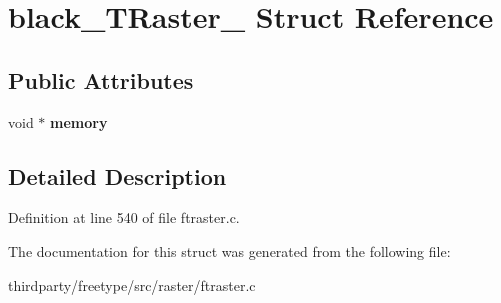 \hypertarget{structblack___t_raster__}{}\section{black\+\_\+\+T\+Raster\+\_\+ Struct Reference}
\label{structblack___t_raster__}
\subsection*{Public Attributes}
\begin{DoxyCompactItemize}
\item 
\mbox{\label{structblack___t_raster___ad6a3fa2e13dab3a132c2db8d7975ed62}} 
void $\ast$ {\bfseries memory}
\end{DoxyCompactItemize}


\subsection{Detailed Description}


Definition at line 540 of file ftraster.\+c.



The documentation for this struct was generated from the following file\+:\begin{DoxyCompactItemize}
\item 
thirdparty/freetype/src/raster/ftraster.\+c\end{DoxyCompactItemize}
